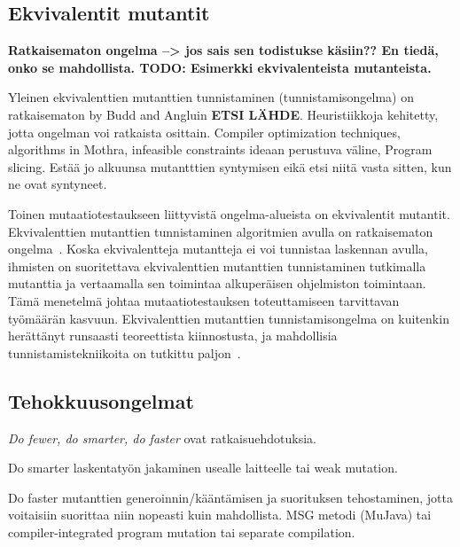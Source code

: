\documentclass[finnish, grading]{tktltiki2}
\theoremstyle{definition}
\theoremstyle{remark}
\begin{document}

\subsection{Ekvivalentit mutantit}

\textbf{Ratkaisematon ongelma --> jos sais sen todistukse käsiin?? En tiedä, onko se mahdollista. TODO: Esimerkki ekvivalenteista mutanteista.}

Yleinen ekvivalenttien mutanttien tunnistaminen (tunnistamisongelma) on ratkaisematon by Budd and Angluin \textbf{ETSI LÄHDE}. Heuristiikkoja kehitetty, jotta ongelman voi ratkaista osittain. Compiler optimization techniques, algorithms in Mothra, infeasible constraints ideaan perustuva väline, Program slicing. Estää jo alkuunsa mutantttien syntymisen eikä etsi niitä vasta sitten, kun ne ovat syntyneet.~\cite[s. 79]{Offutt:Ma:Kwon:2006:MuClassLevel}

Toinen mutaatiotestaukseen liittyvistä ongelma-alueista on ekvivalentit mutantit. Ekvivalenttien mutanttien tunnistaminen algoritmien avulla on ratkaisematon ongelma~\cite[s. 657]{Jia:Harman:2011}. Koska ekvivalentteja mutantteja ei voi tunnistaa laskennan avulla, ihmisten on suoritettava ekvivalenttien mutanttien tunnistaminen tutkimalla mutanttia ja vertaamalla sen toimintaa alkuperäisen ohjelmiston toimintaan. Tämä menetelmä johtaa mutaatiotestauksen toteuttamiseen tarvittavan työmäärän kasvuun. Ekvivalenttien mutanttien tunnistamisongelma on kuitenkin herättänyt runsaasti teoreettista kiinnostusta, ja mahdollisia tunnistamistekniikoita on tutkittu paljon~\cite[s. 657]{Jia:Harman:2011}. 

\subsection{Tehokkuusongelmat}

\textit{Do fewer, do smarter, do faster} ovat ratkaisuehdotuksia.~\cite[s. 121]{Ma:Offutt:Kwon:2005:MuAutomated} 

Do smarter laskentatyön jakaminen usealle laitteelle tai weak mutation. 

Do faster mutanttien generoinnin/kääntämisen ja suorituksen tehostaminen, jotta voitaisiin suorittaa niin nopeasti kuin mahdollista. MSG metodi (MuJava) tai compiler-integrated program mutation tai separate compilation.
\end{document}
